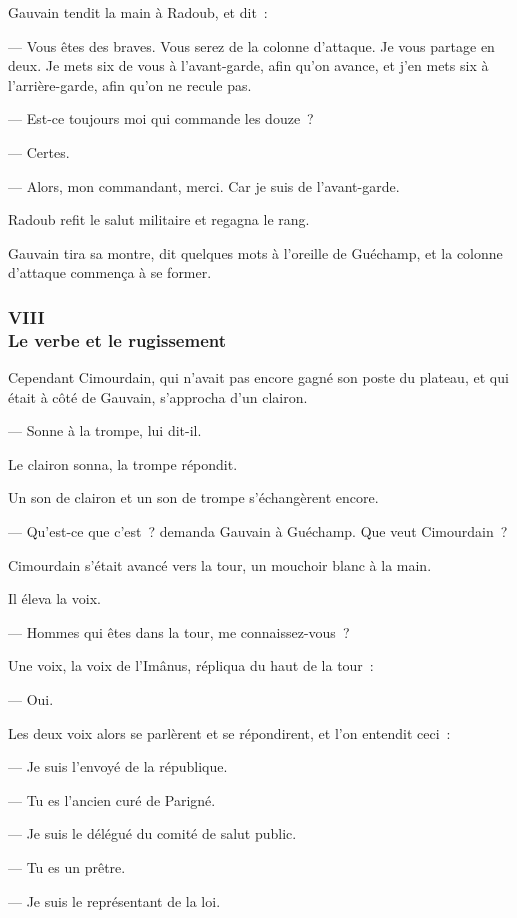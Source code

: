 \documentclass[french,twoside]{book} %
\begin{document}
Gauvain tendit la main à Radoub, et dit :\par
— Vous êtes des braves. Vous serez de la colonne d’attaque. Je vous partage en deux. Je mets six de vous à l’avant-garde, afin qu’on avance, et j’en mets six à l’arrière-garde, afin qu’on ne recule pas.\par
— Est-ce toujours moi qui commande les douze ?\par
— Certes.\par
 — Alors, mon commandant, merci. Car je suis de l’avant-garde.\par
Radoub refit le salut militaire et regagna le rang.\par
Gauvain tira sa montre, dit quelques mots à l’oreille de Guéchamp, et la colonne d’attaque commença à se former.
 \subsubsection[{VIII. Le verbe et le rugissement}]{VIII \\
Le verbe et le rugissement}
\label{p3l4c8}
\noindent Cependant Cimourdain, qui n’avait pas encore gagné son poste du plateau, et qui était à côté de Gauvain, s’approcha d’un clairon.\par
— Sonne à la trompe, lui dit-il.\par
Le clairon sonna, la trompe répondit.\par
Un son de clairon et un son de trompe s’échangèrent encore.\par
— Qu’est-ce que c’est ? demanda Gauvain à Guéchamp. Que veut Cimourdain ?\par
Cimourdain s’était avancé vers la tour, un mouchoir blanc à la main.\par
Il éleva la voix.\par
— Hommes qui êtes dans la tour, me connaissez-vous ?\par
Une voix, la voix de l’Imânus, répliqua du haut de la tour :\par
— Oui.\par
Les deux voix alors se parlèrent et se répondirent, et l’on entendit ceci :\par
— Je suis l’envoyé de la république.\par
— Tu es l’ancien curé de Parigné.\par
 — Je suis le délégué du comité de salut public.\par
— Tu es un prêtre.\par
— Je suis le représentant de la loi.\par
\end{document}
